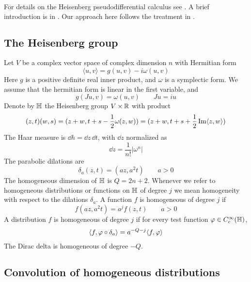 \documentclass[11pt]{amsart}
\theoremstyle{plain}
\theoremstyle{definition}
\theoremstyle{remark}
\begin{document}
For details on the Heisenberg pseudodifferential calculus see \cite{Ta84,BG88, CGGP92, Ep04, Po08}.
A brief introduction is in \cite[Sections~2--3]{GvE20}.
Our approach here follows the treatment in \cite{vEY19}.

\subsection{The Heisenberg group}\label{sec:Heisenberg group}
Let $V$ be a complex vector space of complex dimension $n$ with Hermitian form
\[\langle u, v \rangle =g(u, v)-i \omega (u, v)\]
Here $g$ is a positive definite real inner product, and $\omega$ is a symplectic form.
We assume that the hermitian form is linear in the first variable, and
\[g(Ju,v)=\omega(u,v)\qquad Ju=iu\]
Denote by $\mathbb{H}$ the Heisenberg group $V \times {\mathbb{R}}$ with product
\begin{equation}\label{eq:heisenberg group law}
(z, t) (w, s)= (z+w, t+s-\frac{1}{2}\omega(z, w)) =(z+w, t+s+\frac{1}{2}\operatorname{Im}\langle z,w \rangle)
\end{equation}
The Haar measure is $\dd h=\dd z\,\dd t$, with $\dd z$ normalized as
\[
       \dd z=\frac{1}{n!}|\omega^n|
\]
The parabolic dilations are
\begin{equation*}
     \delta_a(z,t)=(az,a^2t)\qquad a>0
\end{equation*}
The homogeneous dimension of $\mathbb{H}$ is $Q=2n+2$.
Whenever we refer to homogeneous distributions or functions on $\mathbb{H}$ of degree $j$ we mean homogeneity with respect to the dilations $\delta_a$.
A function $f$ is homogeneous of degree $j$ if
\[ f(az,a^2t) = a^{j}f(z,t)\qquad a>0 \]
A distribution $f$
is homogeneous of degree $j$ if for every test function $\varphi\in C_c^\infty(\mathbb{H})$,
\[ \langle f,\varphi\circ \delta_a \rangle = a^{-Q-j}\langle f,\varphi \rangle\]
The Dirac delta is homogeneous of degree $-Q$.

\subsection{Convolution of homogeneous distributions}\label{sec:model symbols}
\end{document}
